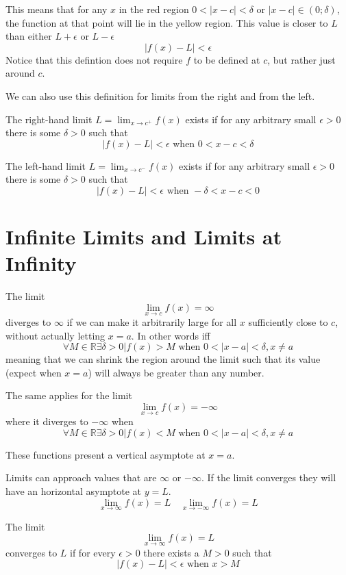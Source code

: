 \documentclass[a4paper]{article}
\begin{document}
This means that for any \(x\) in the red region \(0<|x-c|<\delta\text{ or }|x-c|\in (0; \delta)\),
the function at that point will lie in the yellow region.
This value is closer to \(L\) than either \(L + \epsilon\) or \(L - \epsilon\)
\[
    |f(x) - L| < \epsilon
\]
Notice that this defintion does not require \(f\) to be defined at \(c\), but rather just around \(c\).

We can also use this definition for limits from the right and from the left.

The right-hand limit \(L=\lim_{x\to c^{+}}f(x)\) exists if for any arbitrary small \(\epsilon > 0\)
there is some \(\delta > 0\) such that
\[
    |f(x)-L|<\epsilon \text{ when } 0 < x-c < \delta
\]

The left-hand limit \(L=\lim_{x\to c^{-}}f(x)\) exists if for any arbitrary small \(\epsilon > 0\)
there is some \(\delta > 0\) such that
\[
    |f(x)-L|<\epsilon \text{ when } -\delta < x-c < 0
\]

\pagebreak

\section{Infinite Limits and Limits at Infinity}

The limit
\[
    \lim_{x\to c}f(x) = \infty
\]
diverges to \(\infty\) if we can make it arbitrarily large for all \(x\)
sufficiently close to \(c\), without actually letting \(x=a\).
In other words iff
\[
    \forall M \in \mathbb{R} \exists \delta > 0 | f(x) > M \text{ when } 0<|x-a|<\delta, x \neq a
\]
meaning that we can shrink the region around the limit such that its value (expect when \(x=a\))
will always be greater than any number.

The same applies for the limit
\[
    \lim_{x\to c}f(x) = -\infty
\]
where it diverges to \(-\infty\) when
\[
    \forall M \in \mathbb{R} \exists \delta > 0 | f(x) < M \text{ when } 0<|x-a|<\delta, x \neq a
\]

These functions present a vertical asymptote at \(x=a\).

Limits can approach values that are \(\infty\) or \(-\infty\).
If the limit converges they will have an horizontal asymptote at \(y=L\).
\[
    \lim_{x \to \infty} f(x) = L
    \quad
    \lim_{x \to -\infty} f(x) = L
\]

The limit
\[
    \lim_{x \to \infty} f(x)=L
\]
converges to \(L\) if for every \(\epsilon > 0\) there exists a \(M > 0\) such that
\[
    |f(x)-L| < \epsilon \text{ when } x > M
\]
\end{document}
